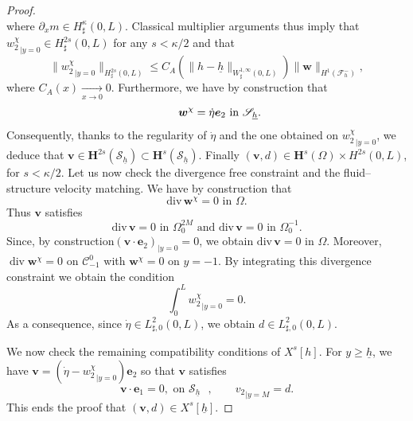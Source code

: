\documentclass[10pt]{amsart}
\let\mathcal\mathscr
\theoremstyle{remark}
\theoremstyle{definition}
\newcommand{\vg}{\boldsymbol{v}}
\DeclareMathOperator{\DIV}{div}
\newcommand{\wg}{\boldsymbol{w}}
\newcommand{\BS}[1]{\boldsymbol{#1}}
\newcommand{\etap}{\dot{\eta}}
\newcommand{\hb}{{\underline{h}}}
\begin{document}
\begin{proof}
\[\]
where $\partial_x m\in H^\kappa_\sharp(0, L)$. Classical multiplier arguments thus imply that ${w_{2}^\chi}_{|{y=0}} \in H^{2s}_{\sharp}(0,L)$ for any $s < \kappa/2$ and that
\begin{equation} \label{eq.lapremieresurw2chi}
\|{w_{2}^\chi}_{|{y=0}}\|_{H^{2s}_{\sharp}(0,L)} \leq C_A(\|h-\hb\|_{W^{1,\infty}_{\sharp}(0,L)}) \|\wg\|_{H^1(\mathcal F^{-}_h)},
\end{equation}
where $C_{A}(x)\underset{x\to 0}{\to}0$.
Furthermore, we have by construction that
\[
\text{
\qquad $\wg^\chi= \etap \BS{e}_{2}$ in $\mathcal {S}_\hb$.}
\]
Consequently, thanks to the regularity of $\etap$ and the one obtained on ${{w}^\chi_{2}}_{|{y=0}}$, we deduce that $\vg\in \BS{H}^{2s}(\mathcal {S}_\hb)\subset \BS{H}^{s}(\mathcal {S}_\hb)$.
Finally $(\vg, d)\in \BS{H}^s(\Omega)\times H^{2s}(0, L)$, for $s<\kappa/2$.
Let us now check the divergence free constraint and the fluid--structure velocity matching.
We have by construction that
\[
\text{
$\text{div}\,\wg^\chi =0$ in $\Omega$.}
\]
Thus $\vg$ satisfies
\[
\text{
$\text{div}\,\vg =0$ in $\Omega^{2M}_{0}$ and $\text{div}\,\vg =0$ in $\Omega^{-1}_{0}$.}
\]
Since, by construction$(\vg\cdot\BS{e}_{2})_{|{y=0}}=0$, we obtain $\text{div}\,\vg =0$ in $\Omega$.
Moreover, $\DIV \wg^{\chi} = 0$ on $\mathcal C_{-1}^0$ with $\wg^{\chi} = 0$ on $y=-1$.
By integrating this divergence constraint we obtain the condition
\[
\int_{0}^L {w_{2}^\chi}_{|{y=0}} = 0.
\]
As a consequence, since $\dot\eta\in L^2_{\sharp,0}(0,L)$, we obtain $d \in L^2_{\sharp,0}(0,L)$.

We now check the remaining compatibility conditions of $X^s[h]$. For $y \geq \hb$, we have $\vg = ( \dot{\eta} - {w_{2}^\chi}_{|{y=0}}) \BS{e}_2$ so that $\vg$ satisfies
\[
\vg \cdot \BS{e}_1 = 0, \text{ on $\mathcal S_{\hb}$ }, \qquad {v_2}_{|{y=M}} = d.
\]
This ends the proof that $(\vg,d) \in X^s[\hb]$.


\end{proof}
\end{document}
